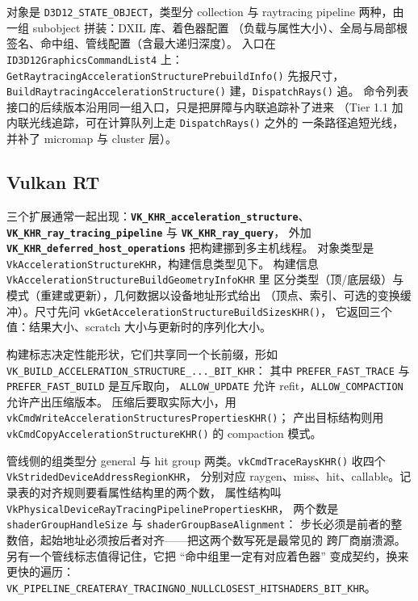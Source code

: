 \documentclass[12pt,a4paper,fontset=fandol]{ctexbook}
\newcommand{\Fn}[1]{\texttt{#1()}}
\newcommand{\Tp}[1]{\texttt{#1}}
\newcommand{\Bk}{\discretionary{}{}{}}
\newcommand{\Lib}[1]{\textbf{\texttt{#1}}}
\begin{document}
对象是 \Tp{D3D12\_{\Bk}STATE\_{\Bk}OBJECT}，类型分 collection 与 raytracing pipeline
两种，由一组 subobject 拼装：DXIL 库、着色器配置
（负载与属性大小）、全局与局部根签名、命中组、管线配置（含最大递归深度）。
入口在 \Tp{ID3D12{\Bk}Graphics{\Bk}Command{\Bk}List4} 上：
\Fn{Get{\Bk}Raytracing{\Bk}Acceleration\Bk Structure{\Bk}Prebuild{\Bk}Info} 先报尺寸，
\Fn{Build{\Bk}Raytracing{\Bk}Acceleration{\Bk}Structure} 建，\Fn{Dispatch{\Bk}Rays} 追。
命令列表接口的后续版本沿用同一组入口，只是把屏障与内联追踪补了进来
（Tier 1.1 加内联光线追踪，可在计算队列上走 \Fn{Dispatch{\Bk}Rays} 之外的
一条路径追短光线，并补了 micromap 与 cluster 层）。

\subsection{Vulkan RT}

三个扩展通常一起出现：\Lib{VK\_{\Bk}KHR{\Bk}\_{\Bk}acceleration{\Bk}\_{\Bk}structure}、
\Lib{VK\_{\Bk}KHR{\Bk}\_{\Bk}ray\_{\Bk}tracing\_{\Bk}pipeline} 与 \Lib{VK\_{\Bk}KHR{\Bk}\_{\Bk}ray\_{\Bk}query}，
外加 \Lib{VK\_{\Bk}KHR{\Bk}\_{\Bk}deferred{\Bk}\_{\Bk}host\_{\Bk}operations} 把构建挪到多主机线程。
对象类型是 \Tp{Vk{\Bk}Acceleration{\Bk}StructureKHR}，构建信息类型见下。
构建信息 \Tp{Vk{\Bk}Acceleration{\Bk}Structure{\Bk}Build{\Bk}Geometry{\Bk}InfoKHR} 里
区分类型（顶/底层级）与模式（重建或更新），几何数据以设备地址形式给出
（顶点、索引、可选的变换缓冲）。尺寸先问 \Fn{vk{\Bk}Get{\Bk}Acceleration{\Bk}Structure{\Bk}Build{\Bk}SizesKHR}，
它返回三个值：结果大小、scratch 大小与更新时的序列化大小。

构建标志决定性能形状，它们共享同一个长前缀，形如
\Tp{VK\_{\Bk}BUILD\_{\Bk}ACCELERATION\_{\Bk}STRUCTURE\_{\Bk}...\_{\Bk}BIT\_{\Bk}KHR}：
其中 \Tp{PREFER\_{\Bk}FAST\_{\Bk}TRACE} 与 \Tp{PREFER\_{\Bk}FAST\_{\Bk}BUILD} 是互斥取向，
\Tp{ALLOW\_{\Bk}UPDATE} 允许 refit，\Tp{ALLOW\_{\Bk}COMPACTION} 允许产出压缩版本。
压缩后要取实际大小，用 \Fn{vk{\Bk}Cmd{\Bk}Write{\Bk}Acceleration{\Bk}Structures{\Bk}PropertiesKHR}；
产出目标结构则用 \Fn{vk{\Bk}Cmd{\Bk}Copy{\Bk}Acceleration{\Bk}StructureKHR} 的 compaction 模式。

管线侧的组类型分 general 与 hit group 两类。\Fn{vk{\Bk}Cmd{\Bk}Trace{\Bk}RaysKHR} 收四个
\Tp{Vk{\Bk}Strided{\Bk}Device{\Bk}Address{\Bk}RegionKHR}，
分别对应 raygen、miss、hit、callable。记录表的对齐规则要看属性结构里的两个数，
属性结构叫 \Tp{Vk{\Bk}Physical{\Bk}Device{\Bk}Ray{\Bk}Tracing{\Bk}Pipeline{\Bk}PropertiesKHR}，
两个数是 \Tp{shader{\Bk}Group{\Bk}Handle{\Bk}Size} 与 \Tp{shader{\Bk}Group{\Bk}Base{\Bk}Alignment}：
步长必须是前者的整数倍，起始地址必须按后者对齐------把这两个数写死是最常见的
跨厂商崩溃源。另有一个管线标志值得记住，它把 ``命中组里一定有对应着色器''
变成契约，换来更快的遍历：
\Tp{VK\_{\Bk}PIPELINE\_{\Bk}CREATE{\Bk}RAY\_{\Bk}TRACING{\Bk}NO\_{\Bk}NULL{\Bk}CLOSEST\_{\Bk}HIT{\Bk}SHADERS\_{\Bk}BIT\_{\Bk}KHR}。
\end{document}
